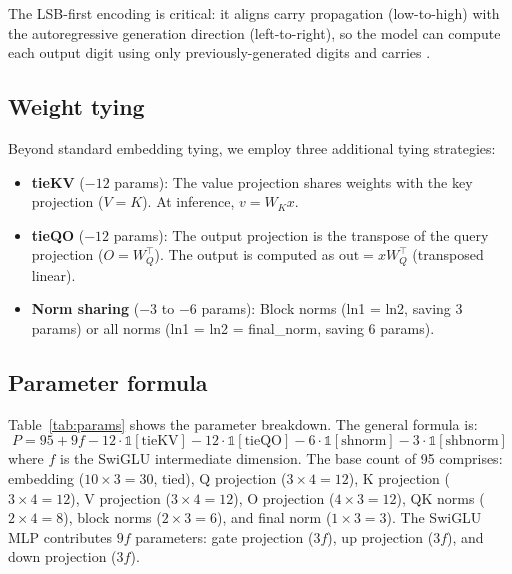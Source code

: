 \documentclass[11pt]{article}
\begin{document}
The LSB-first encoding is critical: it aligns carry propagation
(low-to-high) with the autoregressive generation direction
(left-to-right), so the model can compute each output digit using only
previously-generated digits and carries \citep{zhangli2024reverse}.

\subsection{Weight tying}

Beyond standard embedding tying, we employ three additional tying
strategies:

\begin{itemize}[leftmargin=*, itemsep=2pt]
  \item \textbf{tieKV} ($-12$ params): The value projection shares weights
    with the key projection ($V = K$). At inference, $v = W_K x$.
  \item \textbf{tieQO} ($-12$ params): The output projection is the
    transpose of the query projection ($O = W_Q^\top$). The output is
    computed as $\text{out} = xW_Q^\top$ (transposed linear).
  \item \textbf{Norm sharing} ($-3$ to $-6$ params): Block norms
    (ln1 = ln2, saving 3 params) or all norms (ln1 = ln2 = final\_norm,
    saving 6 params).
\end{itemize}

\subsection{Parameter formula}

Table~\ref{tab:params} shows the parameter breakdown. The general formula
is:
\begin{equation}
  P = 95 + 9f
    - 12 \cdot \mathds{1}[\text{tieKV}]
    - 12 \cdot \mathds{1}[\text{tieQO}]
    - 6 \cdot \mathds{1}[\text{shnorm}]
    - 3 \cdot \mathds{1}[\text{shbnorm}]
  \label{eq:params}
\end{equation}
where $f$ is the SwiGLU intermediate dimension. The base count of 95
comprises: embedding ($10 \times 3 = 30$, tied), Q projection ($3
\times 4 = 12$), K projection ($3 \times 4 = 12$), V projection ($3
\times 4 = 12$), O projection ($4 \times 3 = 12$), QK norms ($2 \times
4 = 8$), block norms ($2 \times 3 = 6$), and final norm ($1 \times 3 =
3$). The SwiGLU MLP contributes $9f$ parameters: gate projection ($3f$),
up projection ($3f$), and down projection ($3f$).
\end{document}
